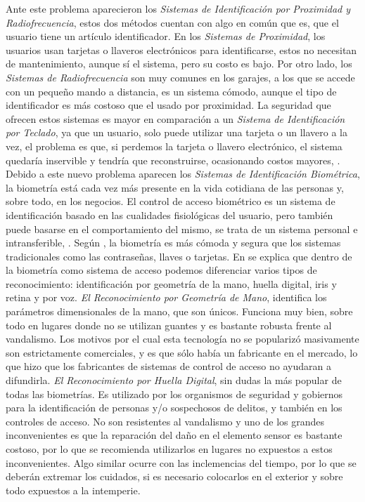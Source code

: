 \vskip 0.5cm
Ante este problema aparecieron los \textit{Sistemas de Identificación por Proximidad y Radiofrecuencia}, estos dos métodos cuentan con algo en común que es, que el usuario tiene un artículo identificador. En los \textit{Sistemas de Proximidad}, los usuarios usan tarjetas o llaveros electrónicos para identificarse, estos no necesitan de mantenimiento, aunque sí el sistema, pero su costo es bajo. Por otro lado, los \textit{Sistemas de Radiofrecuencia} son muy comunes en los garajes, a los que se accede con un pequeño mando a distancia, es un sistema cómodo, aunque el tipo de identificador es más costoso que el usado por proximidad. La seguridad que ofrecen estos sistemas es mayor en comparación a un \textit{Sistema de Identificación por Teclado}, ya que un usuario, solo puede utilizar una tarjeta o un llavero a la vez, el problema es que, si perdemos la tarjeta o llavero electrónico, el sistema quedaría inservible y tendría que reconstruirse, ocasionando costos mayores, \cite{fermax}.
\vskip 0.5cm
Debido a este nuevo problema aparecen los \textit{Sistemas de Identificación Biométrica}, la biometría está cada vez más presente en la vida cotidiana de las personas y, sobre todo, en los negocios. El control de acceso biométrico es un sistema de identificación basado en las cualidades fisiológicas del usuario, pero también puede basarse en el comportamiento del mismo, se trata de un sistema personal e intransferible, \cite{fermax}. Según \citep{hugo}, la biometría es más cómoda y segura que los sistemas tradicionales como las contraseñas, llaves o tarjetas.
\vskip 0.5cm
En \citep{cosentino} se explica que dentro de la biometría como sistema de acceso podemos diferenciar varios tipos de reconocimiento: identificación por geometría de la mano, huella digital, iris y retina y por voz.
\vskip 0.5cm
\textit{El Reconocimiento por Geometría de Mano}, identifica los parámetros dimensionales de la mano, que son únicos. Funciona muy bien, sobre todo en lugares donde no se utilizan guantes y es bastante robusta frente al vandalismo. Los motivos por el cual esta tecnología no se popularizó masivamente son estrictamente comerciales, y es que sólo había un fabricante en el mercado, lo que hizo que los fabricantes de sistemas de control de acceso no ayudaran a difundirla.
\vskip 0.5cm
\textit{El Reconocimiento por Huella Digital}, sin dudas la más popular de todas las biometrías. Es utilizado por los organismos de seguridad y gobiernos para la identificación de personas y/o sospechosos de delitos, y también en los controles de acceso. No son resistentes al vandalismo y uno de los grandes inconvenientes es que la reparación del daño en el elemento sensor es bastante costoso, por lo que se recomienda utilizarlos en lugares no expuestos a estos inconvenientes. Algo similar ocurre con las inclemencias del tiempo, por lo que se deberán extremar los cuidados, si es necesario colocarlos en el exterior y sobre todo expuestos a la intemperie.
